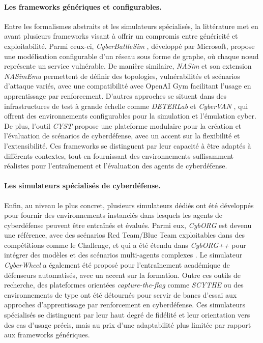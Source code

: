 \paragraph{Les frameworks génériques et configurables.}
Entre les formalismes abstraits et les simulateurs spécialisés, la littérature met en avant plusieurs frameworks visant à offrir un compromis entre généricité et exploitabilité. Parmi ceux-ci, \textit{CyberBattleSim} \cite{cyberbattlesim}, développé par Microsoft, propose une modélisation configurable d’un réseau sous forme de graphe, où chaque nœud représente un service vulnérable. De manière similaire, \textit{NASim} \cite{nasim2023} et son extension \textit{NASimEmu} \cite{fernandes2024nasimemu} permettent de définir des topologies, vulnérabilités et scénarios d’attaque variés, avec une compatibilité avec OpenAI Gym facilitant l’usage en apprentissage par renforcement. D’autres approches se situent dans des infrastructures de test à grande échelle comme \textit{DETERLab} et \textit{CyberVAN} \cite{Mirkovic2010}, qui offrent des environnements configurables pour la simulation et l’émulation cyber. De plus, l'outil \textit{CYST} \cite{Drasar2020} propose une plateforme modulaire pour la création et l’évaluation de scénarios de cyberdéfense, avec un accent sur la flexibilité et l’extensibilité. Ces frameworks se distinguent par leur capacité à être adaptés à différents contextes, tout en fournissant des environnements suffisamment réalistes pour l’entraînement et l’évaluation des agents de cyberdéfense.

\paragraph{Les simulateurs spécialisés de cyberdéfense.}
Enfin, au niveau le plus concret, plusieurs simulateurs dédiés ont été développés pour fournir des environnements instanciés dans lesquels les agents de cyberdéfense peuvent être entraînés et évalués. Parmi eux, \textit{CybORG} \cite{Standen2021} est devenu une référence, avec des scénarios Red Team/Blue Team exploitables dans des compétitions comme le  Challenge, et qui a été étendu dans \textit{CybORG++} pour intégrer des modèles  et des scénarios multi-agents complexes \cite{landolt2025cyborgpp}. Le simulateur \textit{CyberWheel} \cite{vyas2025cyberwheel} a également été proposé pour l’entraînement académique de défenseurs automatisés, avec un accent sur la formation. Outre ces outils de recherche, des plateformes orientées \textit{capture-the-flag} comme \textit{SCYTHE} ou des environnements de type  \cite{palmer2023ctf} ont été détournés pour servir de bancs d’essai aux approches d’apprentissage par renforcement en cyberdéfense. Ces simulateurs spécialisés se distinguent par leur haut degré de fidélité et leur orientation vers des cas d’usage précis, mais au prix d’une adaptabilité plus limitée par rapport aux frameworks génériques.


